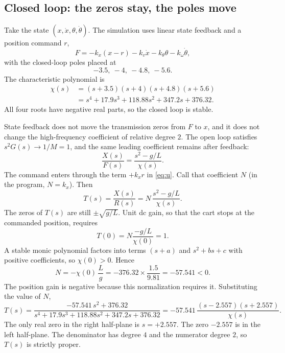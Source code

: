 \documentclass[12pt,a4paper]{article}
\begin{document}
\subsection{Closed loop: the zeros stay, the poles move}

Take the state \((x,\dot x,\theta,\dot\theta)\).
The simulation uses linear state feedback and a position command \(r\),
\begin{equation}
  F=-k_x(x-r)-k_v\dot x-k_\theta\theta-k_\omega\dot\theta,
  \label{eq:u}
\end{equation}
with the closed-loop poles placed at
\[
  -3.5,\ -4,\ -4.8,\ -5.6.
\]
The characteristic polynomial is
\begin{align}
  \chi(s)&=(s+3.5)(s+4)(s+4.8)(s+5.6) \nonumber\\
         &=s^4+17.9s^3+118.88s^2+347.2s+376.32.
  \label{eq:chi}
\end{align}
All four roots have negative real parts, so the closed loop is stable.

State feedback does not move the transmission zeros from \(F\) to \(x\), and it does not change the high-frequency coefficient of relative degree \(2\).
The open loop satisfies \(s^2G(s)\to 1/M=1\), and the same leading coefficient remains after feedback:
\[
  \frac{X(s)}{F(s)}=\frac{s^2-g/L}{\chi(s)}.
\]
The command enters through the term \(+k_x r\) in \eqref{eq:u}.
Call that coefficient \(N\) (in the program, \(N=k_x\)). Then
\begin{equation}
  T(s)=\frac{X(s)}{R(s)}=N\,\frac{s^2-g/L}{\chi(s)}.
  \label{eq:T}
\end{equation}
The zeros of \(T(s)\) are still \(\pm\sqrt{g/L}\).
Unit dc gain, so that the cart stops at the commanded position, requires
\[
  T(0)=N\frac{-g/L}{\chi(0)}=1.
\]
A stable monic polynomial factors into terms \((s+a)\) and \(s^2+bs+c\) with positive coefficients, so \(\chi(0)>0\). Hence
\begin{equation}
  N=-\chi(0)\,\frac{L}{g}
   =-376.32\times\frac{1.5}{9.81}
   =-57.541<0.
  \label{eq:N}
\end{equation}
The position gain is negative because this normalization requires it.
Substituting the value of \(N\),
\begin{equation}
  T(s)=\frac{-57.541\,s^2+376.32}{s^4+17.9s^3+118.88s^2+347.2s+376.32}
      =-57.541\,\frac{(s-2.557)(s+2.557)}{\chi(s)}.
  \label{eq:Tnum}
\end{equation}
The only real zero in the right half-plane is \(s=+2.557\).
The zero \(-2.557\) is in the left half-plane.
The denominator has degree \(4\) and the numerator degree \(2\), so \(T(s)\) is strictly proper.
\end{document}

